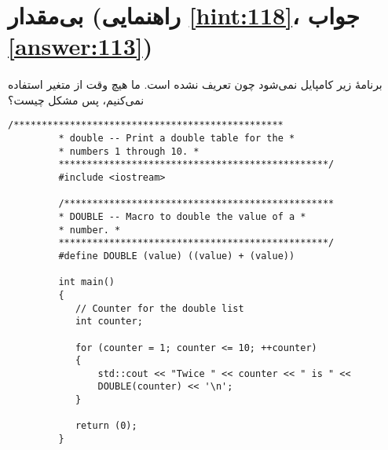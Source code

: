 \section[بی‌مقدار]{بی‌مقدار \protect{} (راهنمایی \ref{hint:118}، جواب \ref{answer:113})}
\paragraph{}\label{prog:77}
برنامهٔ زیر کامپایل نمی‌شود چون  تعریف نشده است. ما هیچ وقت از متغیر  استفاده نمی‌کنیم، پس مشکل چیست؟

\begin{LTR}
    \begin{lstlisting}[style=C++Style]
         /************************************************
         * double -- Print a double table for the *
         * numbers 1 through 10. *
         ************************************************/
         #include <iostream>

         /************************************************
         * DOUBLE -- Macro to double the value of a *
         * number. *
         ************************************************/
         #define DOUBLE (value) ((value) + (value))

         int main()
         {
         	// Counter for the double list
         	int counter;

         	for (counter = 1; counter <= 10; ++counter)
         	{
         		std::cout << "Twice " << counter << " is " <<
         		DOUBLE(counter) << '\n';
         	}

         	return (0);
         }
    \end{lstlisting}
\end{LTR}